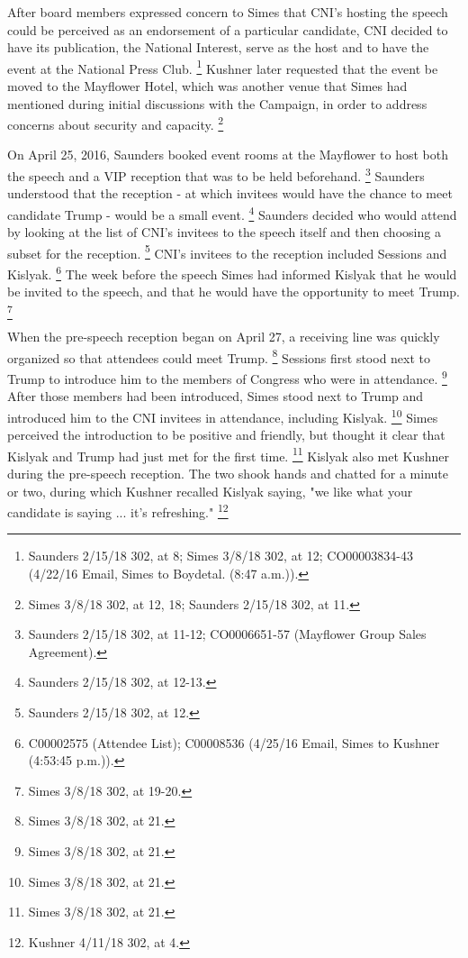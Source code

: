 After board members expressed concern to Simes that CNI's hosting the speech could be perceived as an endorsement of a particular candidate, CNI decided to have its publication, the National Interest, serve as the host and to have the event at the National Press Club.%
\footnote{Saunders 2/15/18 302, at 8; 
Simes 3/8/18 302, at 12; 
CO00003834-43 (4/22/16 Email, Simes to Boydetal. (8:47 a.m.)).}
Kushner later requested that the event be moved to the Mayflower Hotel, which was another venue that Simes had mentioned during initial discussions with the Campaign, in order to address concerns about security and capacity.%
\footnote{Simes 3/8/18 302, at 12, 18; 
Saunders 2/15/18 302, at 11.}

On April 25, 2016, Saunders booked event rooms at the Mayflower to host both the speech and a VIP reception that was to be held beforehand.%
\footnote{Saunders 2/15/18 302, at 11-12; 
CO0006651-57 (Mayflower Group Sales Agreement).}
Saunders understood that the reception - at which invitees would have the chance to meet candidate Trump - would be a small event.%
\footnote{Saunders 2/15/18 302, at 12-13.}
Saunders decided who would attend by looking at the list of CNI's invitees to the speech itself and then choosing a subset for the reception.%
\footnote{Saunders 2/15/18 302, at 12.}
CNI's invitees to the reception included Sessions and Kislyak.%
\footnote{C00002575 (Attendee List); 
C00008536 (4/25/16 Email, Simes to Kushner (4:53:45 p.m.)).}
The week before the speech Simes had informed Kislyak that he would be invited to the speech, and that he would have the opportunity to meet Trump.%
\footnote{Simes 3/8/18 302, at 19-20.}

When the pre-speech reception began on April 27, a receiving line was quickly organized so that attendees could meet Trump.%
\footnote{Simes 3/8/18 302, at 21.}
Sessions first stood next to Trump to introduce him to the members of Congress who were in attendance.%
\footnote{Simes 3/8/18 302, at 21.}
After those members had been introduced, Simes stood next to Trump and introduced him to the CNI invitees in attendance, including Kislyak.%
\footnote{Simes 3/8/18 302, at 21.}
Simes perceived the introduction to be positive and friendly, but thought it clear that Kislyak and Trump had just met for the first time.%
\footnote{Simes 3/8/18 302, at 21.}
Kislyak also met Kushner during the pre-speech reception.
The two shook hands and chatted for a minute or two, during which Kushner recalled Kislyak saying, "we like what your candidate is saying ... it's refreshing."%
\footnote{Kushner 4/11/18 302, at 4.}

